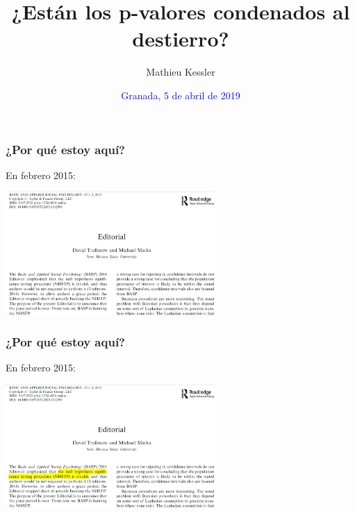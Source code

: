 \documentclass[9pt]{beamer}
\begin{document}
\title{¿Están los p-valores condenados al destierro?}

\author[Mathieu Kessler]{Mathieu Kessler}
\date{\textcolor{blue}{Granada, 5 de abril de 2019}}

\begin{frame}
  \titlepage
\end{frame}
\begin{frame}
  \frametitle{¿Por qué estoy aquí?}
  \begin{overlayarea}{\textwidth}{\textheight}
    En febrero 2015:
    \begin{center}
      \includegraphics[width=8cm]{images/ban_editorial_0.png}
    \end{center}

  \end{overlayarea}
\end{frame}
\begin{frame}
  \frametitle{¿Por qué estoy aquí?}
  \begin{overlayarea}{\textwidth}{\textheight}
    En febrero 2015:
    \begin{center}
      \includegraphics[width=8cm]{images/ban_editorial_1.png}
    \end{center}
  \end{overlayarea}
\end{frame}
\end{document}

